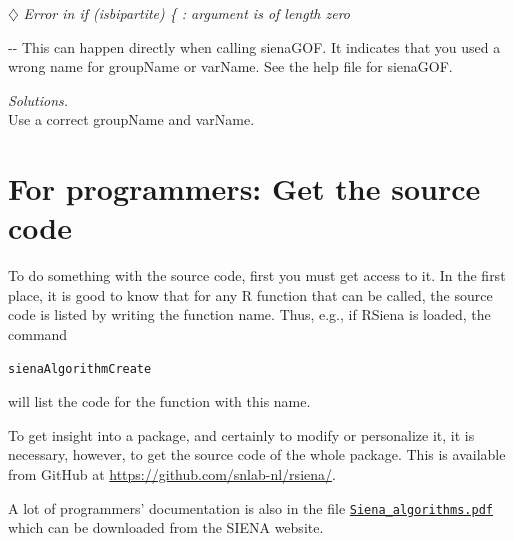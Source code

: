 \documentclass[a4paper,fleqn,11pt]{article}
\makeatletter
\newcommand{\+}{\, + \,}
\newcommand{\sfn}[1]{\textsf{#1}}
\newcommand{\R}{{\sf R }}
\newcommand{\RS}{{\sf RSiena }}
\newcommand{\SI}{{\sf SIENA }}
\newenvironment{indentation}[2]
{\par \setlength{\leftmargin}{#1}       \setlength{\rightmargin}{#2}
  \advance\linewidth -\leftmargin       \advance\linewidth -\rightmargin
  \advance\@totalleftmargin\leftmargin  \@setpar{{\@@par}}%
  \parshape 1 \@totalleftmargin         \linewidth \ignorespaces}{\par}
\makeatother
\begin{document}
\noindent
$\diamondsuit$
\emph{Error in if (isbipartite) \{ : argument is of length zero }
\smallskip

\begin{indentation}{0.04\textwidth}{0pt}
\noindent
This can happen directly when calling \sfn{sienaGOF}.
It indicates that you used a wrong name for \sfn{groupName} or \sfn{varName}.
See the help file for \sfn{sienaGOF}.
\smallskip

\noindent
\emph{Solutions.} \\
Use a correct \sfn{groupName} and \sfn{varName}.
\end{indentation}

\newpage

\section{For programmers: Get the source code}

To do something with the source code,
first you must get access to it.
In the first place, it is good to know that for any \R function
that can be called,
the source code is listed by writing the function name.
Thus, e.g., if \RS is loaded, the command
\begin{verbatim}
sienaAlgorithmCreate
\end{verbatim}
will list the code for the function with this name.

To get insight into a package, and certainly to modify
or personalize it, it is necessary, however,
to get the source code of the whole package.
This is available from GitHub at
\url{https://github.com/snlab-nl/rsiena/}.

A lot of programmers' documentation is also in the file
\href{http://www.stats.ox.ac.uk/~snijders/siena/Siena_algorithms.pdf}{\texttt{Siena\_algorithms.pdf}}
which can be downloaded from the
\SI website.
\end{document}
